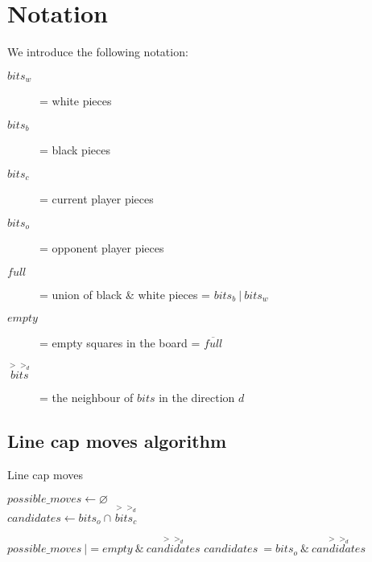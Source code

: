 \documentclass{article}
\begin{document}
\section{Notation}
We introduce the following notation:

\begin{description}
    \item[$bits_w$] = white pieces
    \item[$bits_b$] = black pieces
    \item[$bits_c$] = current player pieces
    \item[$bits_o$] = opponent player pieces
    \item[$full$]   = union of black \& white pieces = $bits_b \: | \: bits_w$
    \item[$empty$]  = empty squares in the board  = $\overline{full}$
    \item[$\overset{>>_d}{bits}$] = the neighbour of $bits$ in the direction $d$
\end{description}

\subsection{Line cap moves algorithm}

\begin{algorithm}
    \caption{Line cap moves}
    \begin{algorithmic} 
        \STATE $possible\_moves \gets \varnothing$ \\
            \STATE $candidates \gets bits_o \cap \overset{>>_d}{bits_c} $ 

                \STATE $possible\_moves \: |= empty \: \& \: \overset{>>_d}{candidates}$
                \STATE $candidates \: = bits_o \: \& \: \overset{>>_d}{candidates}$
            \ENDWHILE
        \ENDFOR
    \end{algorithmic}
\end{algorithm}
\end{document}
